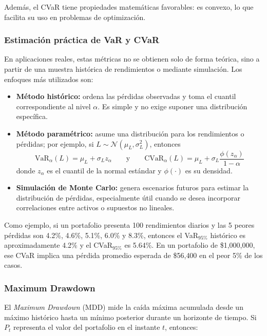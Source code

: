 Además, el CVaR tiene propiedades matemáticas favorables: es convexo,
lo que facilita su uso en problemas de optimización.

\subsubsection{Estimación práctica de VaR y CVaR}

En aplicaciones reales, estas métricas no se obtienen solo de forma
teórica, sino a partir de una muestra histórica de rendimientos o
mediante simulación. Los enfoques más utilizados son:

\begin{itemize}
  \item \textbf{Método histórico:} ordena las pérdidas observadas y
    toma el cuantil correspondiente al nivel $\alpha$. Es simple y no
    exige suponer una distribución específica.
  \item \textbf{Método paramétrico:} asume una distribución para los
    rendimientos o pérdidas; por ejemplo, si $L \sim \mathcal{N}
    (\mu_L, \sigma_L^2)$, entonces
    \begin{equation}
      \mathrm{VaR}_{\alpha}(L) = \mu_L + \sigma_L z_{\alpha}
      \qquad \text{y} \qquad
      \mathrm{CVaR}_{\alpha}(L) = \mu_L + \sigma_L
      \frac{\phi(z_{\alpha})}{1-\alpha}
    \end{equation}
    donde $z_{\alpha}$ es el cuantil de la normal estándar y
    $\phi(\cdot)$ es su densidad.
  \item \textbf{Simulación de Monte Carlo:} genera escenarios futuros
    para estimar la distribución de pérdidas, especialmente útil cuando
    se desea incorporar correlaciones entre activos o supuestos no
    lineales.
\end{itemize}

Como ejemplo, si un portafolio presenta 100 rendimientos diarios y las
5 peores pérdidas son 4.2\%, 4.6\%, 5.1\%, 6.0\% y 8.3\%, entonces el
VaR$_{95\%}$ histórico es aproximadamente 4.2\% y el CVaR$_{95\%}$ es
5.64\%. En un portafolio de \$1{,}000{,}000, ese CVaR implica una
pérdida promedio esperada de \$56{,}400 en el peor 5\% de los casos.

\subsubsection{Maximum Drawdown}

El \textit{Maximum Drawdown} (MDD) mide la caída máxima acumulada desde
un máximo histórico hasta un mínimo posterior durante un horizonte de
tiempo. Si $P_t$ representa el valor del portafolio en el instante $t$,
entonces:

